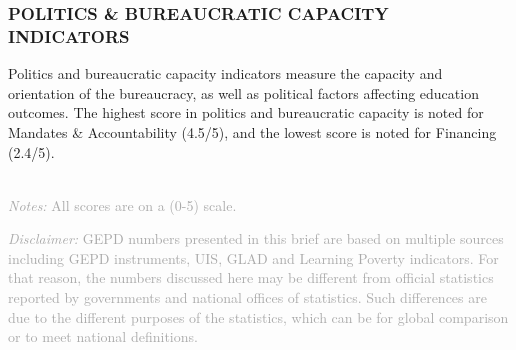 \documentclass[twocolumn]{article}
\begin{document}
\hypertarget{politics-bureaucratic-capacity-indicators}{%
\subsubsection{\texorpdfstring{\textbf{POLITICS \& BUREAUCRATIC CAPACITY
INDICATORS}}{POLITICS \& BUREAUCRATIC CAPACITY INDICATORS}}\label{politics-bureaucratic-capacity-indicators}}

Politics and bureaucratic capacity indicators measure the capacity and
orientation of the bureaucracy, as well as political factors affecting
education outcomes. The highest score in politics and bureaucratic
capacity is noted for Mandates \& Accountability (4.5/5), and the lowest
score is noted for Financing (2.4/5).

\begin{table}[H]
\\
{\scriptsize
    \textcolor{darkgray}{\textit{Notes:} All scores are on a (0-5) scale.}
  }

\end{table}
\raggedbottom

{\scriptsize
    \textcolor{darkgray}{\textit{Disclaimer:} GEPD numbers presented in this brief are based on multiple sources including GEPD instruments, UIS, GLAD and Learning Poverty indicators. For that reason, the numbers discussed here may be different from official statistics reported by governments and national offices of statistics. Such differences are due to the different purposes of the statistics, which can be for global comparison or to meet national definitions.}
  }
\end{document}
